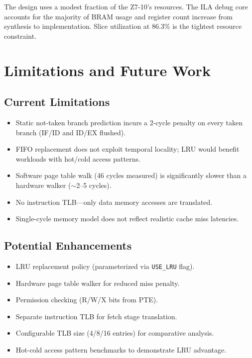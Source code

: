 \documentclass[conference]{IEEEtran}
\begin{document}
The design uses a modest fraction of the Z7-10's resources. The ILA debug core accounts for the majority of BRAM usage and register count increase from synthesis to implementation. Slice utilization at 86.3\% is the tightest resource constraint.

\section{Limitations and Future Work}
\label{sec:limitations}

\subsection{Current Limitations}

\begin{itemize}
    \item Static not-taken branch prediction incurs a 2-cycle penalty on every taken branch (IF/ID and ID/EX flushed).
    \item FIFO replacement does not exploit temporal locality; LRU would benefit workloads with hot/cold access patterns.
    \item Software page table walk (46 cycles measured) is significantly slower than a hardware walker ($\sim$2--5 cycles).
    \item No instruction TLB---only data memory accesses are translated.
    \item Single-cycle memory model does not reflect realistic cache miss latencies.
\end{itemize}

\subsection{Potential Enhancements}

\begin{itemize}
    \item LRU replacement policy (parameterized via \texttt{USE\_LRU} flag).
    \item Hardware page table walker for reduced miss penalty.
    \item Permission checking (R/W/X bits from PTE).
    \item Separate instruction TLB for fetch stage translation.
    \item Configurable TLB size (4/8/16 entries) for comparative analysis.
    \item Hot-cold access pattern benchmarks to demonstrate LRU advantage.
\end{itemize}
\end{document}
